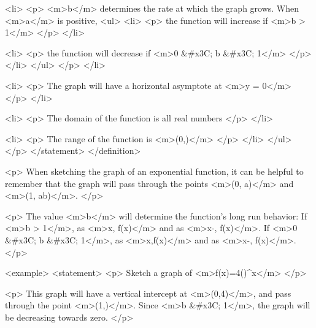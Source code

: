                         <li>
                            <p>
                                <m>b</m> determines the rate at which the graph grows. When <m>a</m> is positive,
                                <ul>
                                    <li>
                                        <p>
                                            the function will increase if <m>b > 1</m>
                                        </p>
                                    </li>

                                    <li>
                                        <p>
                                            the function will decrease if <m>0 &#x3C; b &#x3C; 1</m>
                                        </p>
                                    </li>
                                </ul>
                            </p>
                        </li>

                        <li>
                            <p>
                                The graph will have a horizontal asymptote at <m>y = 0</m>
                            </p>
                        </li>

                        <li>
                            <p>
                                The domain of the function is all real numbers
                            </p>
                        </li>

                        <li>
                            <p>
                                The range of the function is <m>(0,\infty)</m>
                            </p>
                        </li>
                    </ul>
                </p>
            </statement>
        </definition>

        <p>
            When sketching the graph of an exponential function, it can be helpful to remember that the graph will pass through the points <m>(0, a)</m> and <m>(1, ab)</m>.
        </p>

        <p>
            The value <m>b</m> will determine the function’s long run behavior: If <m>b > 1</m>, as <m>x\to \infty, f(x)\to \infty</m> and as <m>x\to-\infty, f(x)</m>.
            If <m>0 &#x3C; b &#x3C; 1</m>, as <m>x\to\infty,f(x)</m> and as <m>x\to-\infty, f(x)\to \infty</m>.
        </p>

        <example>
            <statement>
                <p>
                    Sketch a graph of <m>f(x)=4()^{x}</m>
                </p>

                <p>
                    This graph will have a vertical intercept at <m>(0,4)</m>, and pass through the point <m>(1,)</m>.
                    Since <m>b &#x3C; 1</m>, the graph will be decreasing towards zero.
                </p>

